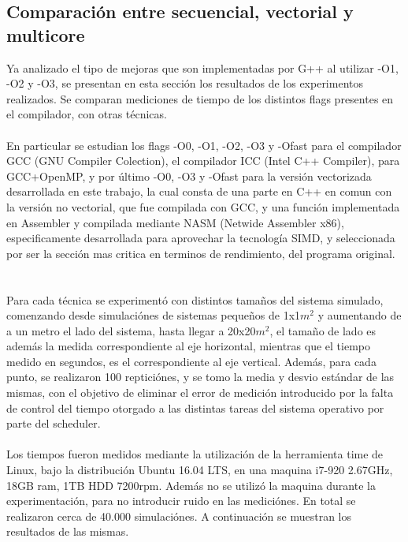 \subsection{Comparación entre secuencial, vectorial y multicore}
Ya analizado el tipo de mejoras que son implementadas por G++ al utilizar -O1, -O2 y -O3, se presentan en esta sección los resultados de los experimentos realizados. Se comparan mediciones de tiempo de los distintos flags presentes en el compilador, con otras técnicas. 
~\\
~\\
En particular se estudian los flags -O0, -O1, -O2, -O3 y -Ofast para el compilador GCC (GNU Compiler Colection), el compilador ICC (Intel C++ Compiler), para GCC+OpenMP, y por último -O0, -O3 y -Ofast para la versión vectorizada desarrollada en este trabajo, la cual consta de una parte en C++ en comun con la versión no vectorial, que fue compilada con GCC, y una función implementada en Assembler y compilada mediante NASM (Netwide Assembler x86), especificamente desarrollada para aprovechar la tecnología SIMD, y seleccionada por ser la sección mas critica en terminos de rendimiento, del programa original.
~\\
~\\
Para cada técnica se experimentó con distintos tamaños del sistema simulado, comenzando desde simulaciónes de sistemas pequeños de 1x1$m^2$ y aumentando de a un metro el lado del sistema, hasta llegar a 20x20$m^2$, el tamaño de lado es además la medida correspondiente al eje horizontal, mientras que el tiempo medido en segundos, es el correspondiente al eje vertical. Además, para cada punto, se realizaron 100 repticiónes, y se tomo la media y desvio estándar de las mismas, con el objetivo de eliminar el error de medición introducido por la falta de control del tiempo otorgado a las distintas tareas del sistema operativo por parte del scheduler. 
~\\
~\\
Los tiempos fueron medidos mediante la utilización de la herramienta time de Linux, bajo la distribución Ubuntu 16.04 LTS, en una maquina i7-920 2.67GHz, 18GB ram, 1TB HDD 7200rpm. Además no se utilizó la maquina durante la experimentación, para no introducir ruido en las mediciónes. En total se realizaron cerca de 40.000 simulaciónes. A continuación se muestran los resultados de las mismas.
~\\
~\\

